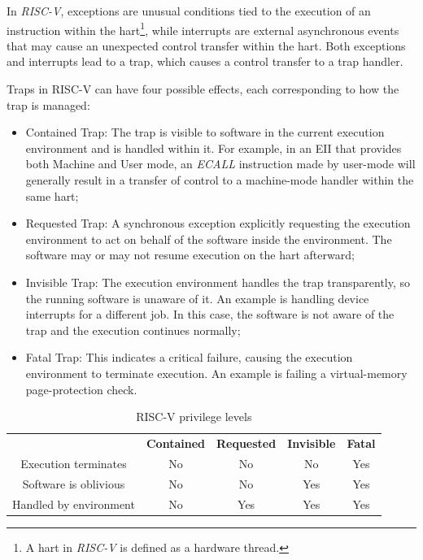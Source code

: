 In \textit{RISC-V}, exceptions are unusual conditions tied to the execution of an
instruction within the hart\footnote{A hart in \textit{RISC-V} is defined as a hardware
thread.}, while interrupts are external asynchronous events that may cause an unexpected
control transfer within the hart. Both exceptions and interrupts lead to a trap,
which causes a control transfer to a trap handler.

Traps in RISC-V can have four possible effects, each corresponding to how the
trap is managed:

\begin{itemize}
  \item Contained Trap: The trap is visible to software in the current execution
    environment and is handled within it. For example, in an EII that provides
    both Machine and User mode, an \textit{ECALL} instruction made by user-mode
    will generally result in a transfer of control to a machine-mode handler
    within the same hart;

  \item Requested Trap: A synchronous exception explicitly requesting the
    execution environment to act on behalf of the software inside the
    environment. The software may or may not resume execution on the hart afterward;

  \item Invisible Trap: The execution environment handles the trap transparently,
    so the running software is unaware of it. An example is handling device
    interrupts for a different job. In this case, the software is not aware of
    the trap and the execution continues normally;

  \item Fatal Trap: This indicates a critical failure, causing the execution environment
    to terminate execution. An example is failing a virtual-memory page-protection
    check.
\end{itemize}

\begin{table}
  \centering
  \begin{tabular}{|c|c|c|c|c|}
    \hline
    \textbf{}                           & \textbf{Contained} & \textbf{Requested} & \textbf{Invisible} & \textbf{Fatal} \\
    \hhline{=====} Execution terminates & No                 & No                 & No                 & Yes            \\
    \hline
    Software is oblivious               & No                 & No                 & Yes                & Yes            \\
    \hline
    Handled by environment              & No                 & Yes                & Yes                & Yes            \\
    \hline
  \end{tabular}
  \caption{RISC-V privilege levels}
  \label{tab:traps}
\end{table}

